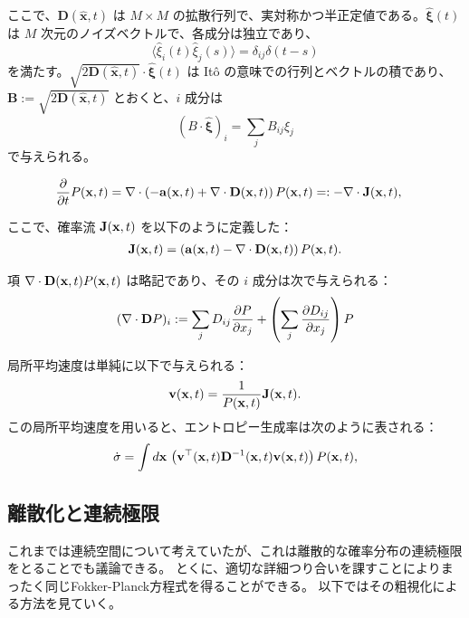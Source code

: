\documentclass[a4paper,11pt]{jsarticle}
\numberwithin{equation}{section}
\begin{document}
ここで、$\bm{D}(\hat{\bm{x}}, t)$ は $M \times M$ の拡散行列で、実対称かつ半正定値である。$\hat{\bm{\xi}}(t)$ は $M$ 次元のノイズベクトルで、各成分は独立であり、
\[
\langle \hat{\xi}_i(t) \hat{\xi}_j(s) \rangle = \delta_{ij} \delta(t - s)
\]
を満たす。$\sqrt{2\bm{D}(\hat{\bm{x}}, t)} \cdot \hat{\bm{\xi}}(t)$ は Itô の意味での行列とベクトルの積であり、$\bm{B} := \sqrt{2\bm{D}(\hat{\bm{x}}, t)}$ とおくと、$i$ 成分は
\[
(B \cdot \hat{\bm{\xi}})_i = \sum_j B_{ij} \hat{\xi}_j
\]
で与えられる。

\vspace{1em}
\begin{align}
\frac{\partial}{\partial t} P(\vb{x}, t) &= \nabla \cdot \left( -\vb{a}(\vb{x}, t) + \nabla \cdot \vb{D}(\vb{x}, t) \right) P(\vb{x}, t) =: -\nabla \cdot \vb{J}(\vb{x}, t),
\end{align}

ここで、確率流 $\vb{J}(\vb{x}, t)$ を以下のように定義した：
\begin{align}
\vb{J}(\vb{x}, t) = \left( \vb{a}(\vb{x}, t) - \nabla \cdot \vb{D}(\vb{x}, t) \right) P(\vb{x}, t).
\end{align}

項 $\nabla \cdot \vb{D}(\vb{x}, t) P(\vb{x}, t)$ は略記であり、その $i$ 成分は次で与えられる：
\begin{align}
(\nabla \cdot \vb{D} P)_i := \sum_j D_{ij} \frac{\partial P}{\partial x_j} + \left( \sum_j \frac{\partial D_{ij}}{\partial x_j} \right) P
\end{align}

局所平均速度は単純に以下で与えられる：
\begin{align}
\vb{v}(\vb{x}, t) = \frac{1}{P(\vb{x}, t)} \vb{J}(\vb{x}, t). 
\end{align}
この局所平均速度を用いると、エントロピー生成率は次のように表される：
\begin{align}
\dot{\sigma} = \int d\vb{x} \, \left( \vb{v}^{\top}(\vb{x}, t) \vb{D}^{-1}(\vb{x}, t) \vb{v}(\vb{x}, t) \right) P(\vb{x}, t), 
\end{align}

\subsection{離散化と連続極限}
これまでは連続空間について考えていたが、これは離散的な確率分布の連続極限をとることでも議論できる。
とくに、適切な詳細つり合いを課すことによりまったく同じFokker-Planck方程式を得ることができる。
以下ではその粗視化による方法を見ていく。
\end{document}
